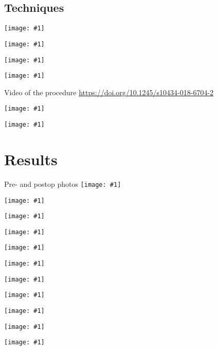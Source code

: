 \documentclass{beamer}
\newcommand*{\solo}[1]{\centering\texttt{[image: \#1]}}
\begin{document}
\subsection{Techniques}
\begin{frame}
    \solo{F1a.png}
\end{frame}

\begin{frame}
    \solo{F1d.png}
\end{frame}

\begin{frame}
    \solo{F1f.png}
\end{frame}

\begin{frame}
    \solo{F1h.png}
\end{frame}

\begin{frame}{Video of the procedure}
    \centering\url{https://doi.org/10.1245/s10434-018-6704-2}
\end{frame}

\begin{frame}
    \solo{F2a.jpg}
\end{frame}

\begin{frame}
    \solo{F2d.jpg}
\end{frame}

\section{Results}
\begin{frame}{Pre- and postop photos}
    \solo{F3a.jpg}
\end{frame}

\begin{frame}
    \solo{F3g.eps}
\end{frame}

\begin{frame}
    \solo{T1a.eps}
\end{frame}

\begin{frame}
    \solo{T1b.eps}
\end{frame}

\begin{frame}
    \solo{T1c.eps}
\end{frame}

\begin{frame}
    \solo{T1d.eps}
\end{frame}

\begin{frame}
    \solo{T1e.eps}
\end{frame}

\begin{frame}
    \solo{T1f.eps}
\end{frame}

\begin{frame}
    \solo{T2a.eps}
\end{frame}

\begin{frame}
    \solo{T2b.eps}
\end{frame}

\begin{frame}
    \solo{T3.eps}
\end{frame}
\end{document}
